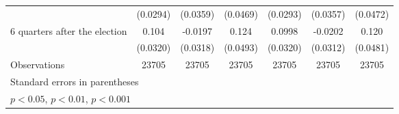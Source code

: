 \begin{table}[!ht]
\begin{tabular}{l*{6}{c}}
                    &    (0.0294)         &    (0.0359)         &    (0.0469)         &    (0.0293)         &    (0.0357)         &    (0.0472)         \\
[0,5em]
 6 quarters after the election&       0.104\sym{**} &     -0.0197         &       0.124\sym{*}  &      0.0998\sym{**} &     -0.0202         &       0.120\sym{*}  \\
                    &    (0.0320)         &    (0.0318)         &    (0.0493)         &    (0.0320)         &    (0.0312)         &    (0.0481)         \\
\hline
Observations        &       23705         &       23705         &       23705         &       23705         &       23705         &       23705         \\
\hline\hline
\multicolumn{7}{l}{\footnotesize Standard errors in parentheses}\\
\multicolumn{7}{l}{\footnotesize \sym{*} \(p<0.05\), \sym{**} \(p<0.01\), \sym{***} \(p<0.001\)}\\
\end{tabular}
\end{table}
